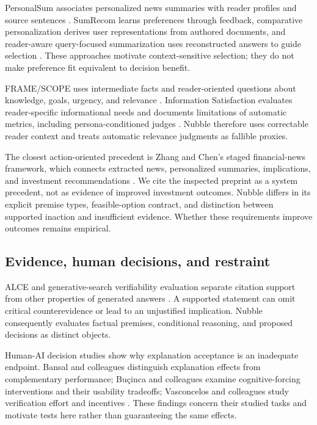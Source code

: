 \documentclass[11pt]{article}
\begin{document}
PersonalSum associates personalized news summaries with reader profiles and source sentences \citep{zhang_etal_2024_personalsum}. SumRecom learns preferences through feedback, comparative personalization derives user representations from authored documents, and reader-aware query-focused summarization uses reconstructed answers to guide selection \citep{ghodratnama_zakershahrak_2024_sumrecom,li_chaturvedi_2025_compsum,spinoso_cheung_2024_rsa}. These approaches motivate context-sensitive selection; they do not make preference fit equivalent to decision benefit.

FRAME/SCOPE uses intermediate facts and reader-oriented questions about knowledge, goals, urgency, and relevance \citep{kirstein_etal_2025_frame_scope}. Information Satisfaction evaluates reader-specific informational needs and documents limitations of automatic metrics, including persona-conditioned judges \citep{cachola_etal_2026_information_satisfaction}. Nubble therefore uses correctable reader context and treats automatic relevance judgments as fallible proxies.

The closest action-oriented precedent is Zhang and Chen's staged financial-news framework, which connects extracted news, personalized summaries, implications, and investment recommendations \citep{zhang_chen_2025_financial_cot}. We cite the inspected preprint as a system precedent, not as evidence of improved investment outcomes. Nubble differs in its explicit premise types, feasible-option contract, and distinction between supported inaction and insufficient evidence. Whether these requirements improve outcomes remains empirical.

\subsection{Evidence, human decisions, and restraint}

ALCE and generative-search verifiability evaluation separate citation support from other properties of generated answers \citep{gao2023alce,liu2023verifiability}. A supported statement can omit critical counterevidence or lead to an unjustified implication. Nubble consequently evaluates factual premises, conditional reasoning, and proposed decisions as distinct objects.

Human-AI decision studies show why explanation acceptance is an inadequate endpoint. Bansal and colleagues distinguish explanation effects from complementary performance; Buçinca and colleagues examine cognitive-forcing interventions and their usability tradeoffs; Vasconcelos and colleagues study verification effort and incentives \citep{bansal2021,bucinca2021,vasconcelos2023}. These findings concern their studied tasks and motivate tests here rather than guaranteeing the same effects.
\end{document}
